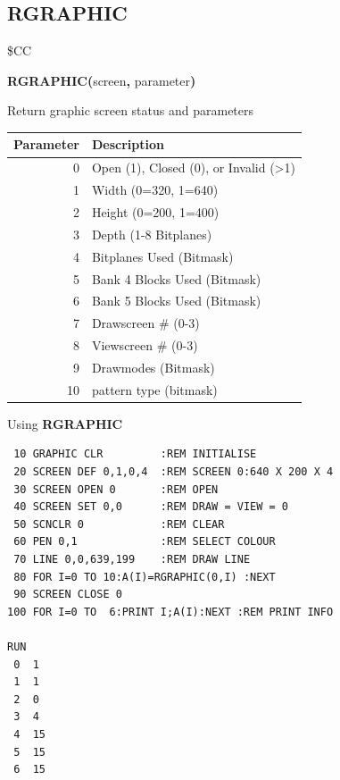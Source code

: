 \subsection{RGRAPHIC}
\begin{description}[leftmargin=2cm,style=nextline]
\item [Token:] \$CC
\item [Format:] {\bf RGRAPHIC(}screen{\bf,} parameter{\bf)}
\item [Usage:]  Return graphic screen status and parameters

\begin{center}
{\setlength{\tabcolsep}{1mm}
\begin{tabular}{|r|l|}
\hline
{\bf Parameter}  & {\bf Description} \\
\hline
0  & Open   (1), Closed (0), or Invalid (>1)  \\
1  & Width  (0=320, 1=640)  \\
2  & Height (0=200, 1=400)  \\
3  & Depth (1-8 Bitplanes)  \\
4  & Bitplanes Used  (Bitmask)  \\
5  & Bank 4 Blocks Used (Bitmask)  \\
6  & Bank 5 Blocks Used (Bitmask)  \\
7  & Drawscreen \# (0-3)  \\
8  & Viewscreen \# (0-3)  \\
9  & Drawmodes  (Bitmask)  \\
10 & pattern type  (bitmask)  \\
\hline
\end{tabular}
}
\end{center}


\item [Example:] Using {\bf RGRAPHIC}

\begin{tcolorbox}[colback=black,coltext=white]
\verbatimfont{\codefont}
\begin{verbatim}
 10 GRAPHIC CLR         :REM INITIALISE
 20 SCREEN DEF 0,1,0,4  :REM SCREEN 0:640 X 200 X 4
 30 SCREEN OPEN 0       :REM OPEN
 40 SCREEN SET 0,0      :REM DRAW = VIEW = 0
 50 SCNCLR 0            :REM CLEAR
 60 PEN 0,1             :REM SELECT COLOUR
 70 LINE 0,0,639,199    :REM DRAW LINE
 80 FOR I=0 TO 10:A(I)=RGRAPHIC(0,I) :NEXT
 90 SCREEN CLOSE 0
100 FOR I=0 TO  6:PRINT I;A(I):NEXT :REM PRINT INFO

RUN
 0  1
 1  1
 2  0
 3  4
 4  15
 5  15
 6  15
\end{verbatim}
\end{tcolorbox}
\end{description}



